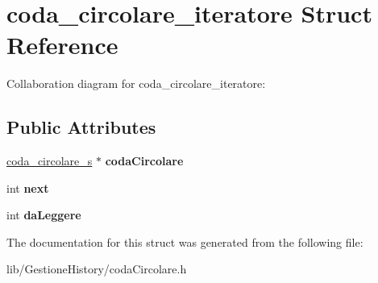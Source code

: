 \hypertarget{structcoda__circolare__iteratore}{}\section{coda\+\_\+circolare\+\_\+iteratore Struct Reference}
\label{structcoda__circolare__iteratore}


Collaboration diagram for coda\+\_\+circolare\+\_\+iteratore\+:
\subsection*{Public Attributes}
\begin{DoxyCompactItemize}
\item 
\mbox{\label{structcoda__circolare__iteratore_a66a33671cbef4ce704c6b8f24633ea34}} 
\hyperlink{structcoda__circolare}{coda\+\_\+circolare\+\_\+s} $\ast$ {\bfseries coda\+Circolare}
\item 
\mbox{\label{structcoda__circolare__iteratore_a93b20c2d2171664c44867bfe40622ad3}} 
int {\bfseries next}
\item 
\mbox{\label{structcoda__circolare__iteratore_a77abeda1e764c6ba0db236b1a0e9728d}} 
int {\bfseries da\+Leggere}
\end{DoxyCompactItemize}


The documentation for this struct was generated from the following file\+:\begin{DoxyCompactItemize}
\item 
lib/\+Gestione\+History/coda\+Circolare.\+h\end{DoxyCompactItemize}
